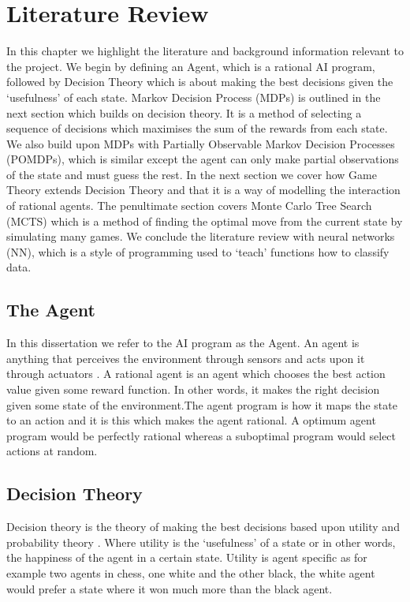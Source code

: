 \documentclass{bhamthesis}
\theoremstyle{definition}
\begin{document}
\chapter{Literature Review}
In this chapter we highlight the literature and background information relevant to the project. We begin by defining an Agent, which is a rational AI program, followed by Decision Theory which is about making the best decisions given the `usefulness' of each state. Markov Decision Process (MDPs) is outlined in the next section which builds on decision theory. It is a method of selecting a sequence of decisions which maximises the sum of the rewards from each state. We also build upon MDPs with Partially Observable Markov Decision Processes (POMDPs), which is similar except the agent can only make partial observations of the state and must guess the rest. In the next section we cover how Game Theory extends Decision Theory and that it is a way of modelling the interaction of rational agents. The penultimate section covers Monte Carlo Tree Search (MCTS) which is a method of finding the optimal move from the current state by simulating many games. We conclude the literature review with neural networks (NN), which is a style of programming used to `teach' functions how to classify data.

\section{The Agent}
In this dissertation we refer to the AI program as the Agent. An agent is anything that perceives the environment through sensors and acts upon it through actuators \cite{Russell2016}. A rational agent is an agent which chooses the best action value given some reward function. In other words, it makes the right decision given some state of the environment.The agent program is how it maps the state to an action and it is this which makes the agent rational. A optimum agent program would be perfectly rational whereas a suboptimal program would select actions at random.

\section{Decision Theory}
Decision theory is the theory of making the best decisions based upon utility and probability theory \cite{Osborne1994}. Where utility is the `usefulness' of a state or in other words, the happiness of the agent in a certain state. Utility is agent specific as for example two agents in chess, one white and the other black, the white agent would prefer a state where it won much more than the black agent. 
\end{document}
